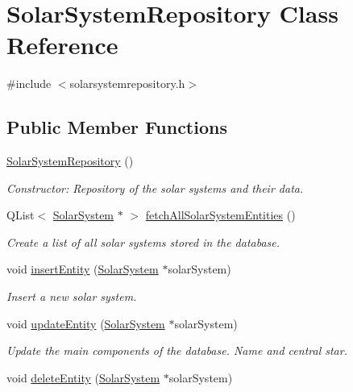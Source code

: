 \hypertarget{classSolarSystemRepository}{
\section{\-Solar\-System\-Repository \-Class \-Reference}
\label{d6/d91/classSolarSystemRepository}
}


{\ttfamily \#include $<$solarsystemrepository.\-h$>$}

\subsection*{\-Public \-Member \-Functions}
\begin{DoxyCompactItemize}
\item 
\hyperlink{classSolarSystemRepository_a589048d551ee6482941b6f33e7bb3216}{\-Solar\-System\-Repository} ()
\begin{DoxyCompactList}\small\item\em \-Constructor\-: \-Repository of the solar systems and their data. \end{DoxyCompactList}\item 
\-Q\-List$<$ \hyperlink{classSolarSystem}{\-Solar\-System} $\ast$ $>$ \hyperlink{classSolarSystemRepository_ab69efdcd44ac869170b8999aa33c3dc8}{fetch\-All\-Solar\-System\-Entities} ()
\begin{DoxyCompactList}\small\item\em \-Create a list of all solar systems stored in the database. \end{DoxyCompactList}\item 
void \hyperlink{classSolarSystemRepository_a84453eab458c2351540ec1942245da92}{insert\-Entity} (\hyperlink{classSolarSystem}{\-Solar\-System} $\ast$solar\-System)
\begin{DoxyCompactList}\small\item\em \-Insert a new solar system. \end{DoxyCompactList}\item 
void \hyperlink{classSolarSystemRepository_a6d3957bdc392b00d697b56f8495beafb}{update\-Entity} (\hyperlink{classSolarSystem}{\-Solar\-System} $\ast$solar\-System)
\begin{DoxyCompactList}\small\item\em \-Update the main components of the database. \-Name and central star. \end{DoxyCompactList}\item 
void \hyperlink{classSolarSystemRepository_a3747b0c12c0770c62b7f9beb22f2ef27}{delete\-Entity} (\hyperlink{classSolarSystem}{\-Solar\-System} $\ast$solar\-System)

\end{DoxyCompactItemize}
